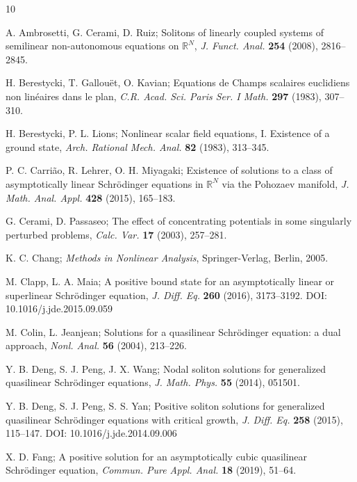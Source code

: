 \documentclass[reqno]{amsart}
\begin{document}
\begin{thebibliography}{10}

 A. Ambrosetti, G. Cerami, D. Ruiz;
Solitons of linearly coupled systems of semilinear non-autonomous equations on ${\mathbb{R}^N}$, 
\emph{J. Funct. Anal. } \textbf{254} (2008), 2816–2845.

 H. Berestycki, T. Gallou\"et, O. Kavian;
Equations de Champs scalaires euclidiens non linéaires dans le plan,  
\emph{C.R. Acad. Sci. Paris Ser. I Math.} \textbf{297} (1983), 307–310.

 H. Berestycki, P. L. Lions;
Nonlinear scalar field equations, I. Existence of a ground state, 
\emph{Arch. Rational Mech. Anal.} \textbf{82}  (1983), 313–345. 

 P. C. Carri\~ao, R. Lehrer, O. H. Miyagaki;
Existence of solutions to a class of asymptotically linear Schr\"odinger equations in ${\mathbb{R}^N} $ via the Pohozaev manifold, 
\emph{J. Math. Anal. Appl.} \textbf{428} (2015), 165–183. 

 G. Cerami, D. Passaseo;
The effect of concentrating potentials in some singularly perturbed problems, 
\emph{Calc. Var.} \textbf{17} (2003), 257–281. 

 K. C. Chang;
\emph{Methods in Nonlinear Analysis}, Springer-Verlag, Berlin, 2005.  

 M. Clapp, L. A. Maia;
A positive bound state for an asymptotically linear or superlinear Schr\"odinger equation, 
\emph{J. Diff. Eq.}  \textbf{260} (2016), 3173–3192. DOI: 10.1016/j.jde.2015.09.059

 M. Colin, L. Jeanjean;
 Solutions for a quasilinear Schr\"odinger equation: a dual approach, 
 \emph{Nonl. Anal.} \textbf{56} (2004), 213--226.

 Y. B. Deng, S. J. Peng, J. X. Wang;
Nodal soliton solutions for generalized quasilinear Schr\"odinger equations, 
\emph{J. Math. Phys.} \textbf{55} (2014), 051501.

 Y. B. Deng, S. J. Peng, S. S. Yan;
Positive soliton solutions for generalized quasilinear Schr\"odinger equations with critical growth, 
\emph{J. Diff. Eq.} \textbf{258} (2015), 115--147. DOI: 10.1016/j.jde.2014.09.006

 X. D. Fang;
A positive solution for an asymptotically cubic quasilinear Schr\"odinger equation, 
\emph{Commun. Pure Appl. Anal.} \textbf{18} (2019), 51--64.


\end{thebibliography}
\end{document}
